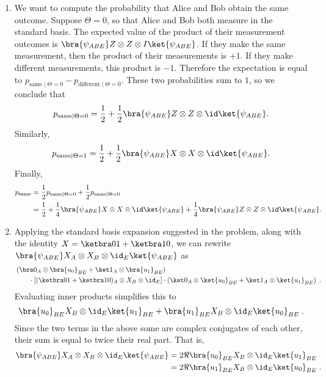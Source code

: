 \begin{exercises}
\begin{enumerate}
\item We want to compute the probability that Alice and Bob obtain the same outcome. Suppose $\Theta = 0$, so that Alice and Bob both measure in the standard basis.
The expected value of the product of their measurement outcomes is $\bra{\psi_{ABE}} Z\otimes Z \otimes I \ket{\psi_{ABE}}$. If they make the same measurement, then the product of their measurements is $+1$. If they make different measurements, this product is $-1$.
Therefore the expectation is equal to $p_{\text{same}\mid\Theta = 0} - p_{\text{different}\mid\Theta = 0}$. These two probabilities sum to $1$, so we conclude that
\[p_{\text{same}\mid\Theta = 0} = \frac12 + \frac 12\bra{\psi_{ABE}} Z\otimes Z \otimes \id \ket{\psi_{ABE}}.\]
Similarly,
\[p_{\text{same}\mid\Theta = 1} = \frac12 + \frac 12\bra{\psi_{ABE}} X\otimes X \otimes \id \ket{\psi_{ABE}}.\]
Finally,
\begin{align*}
p_{\text{same}} &= \frac12 p_{\text{same}\mid\Theta = 0} + \frac 12 p_{\text{same}\mid\Theta = 0}\\
&= \frac12 + \frac 14\bra{\psi_{ABE}} X\otimes X \otimes \id \ket{\psi_{ABE}}+ \frac 14\bra{\psi_{ABE}} Z\otimes Z \otimes \id \ket{\psi_{ABE}}.
\end{align*}

\item Applying the standard basis expansion suggested in the problem, along with the identity $X = \ketbra 01 + \ketbra 10$, we can rewrite $\bra{\psi_{ABE}} X_A\otimes X_B \otimes \id_E \ket{\psi_{ABE}}$ as
\begin{align*}
&\left(\bra 0_A \otimes \bra{u_0}_{BE} +\ket 1_A \otimes \bra{u_1}_{BE}\right)\\
&\qquad \cdot \left[(\ketbra01 + \ketbra10)_A\otimes X_B\otimes \id_E \right] \cdot  \left(\ket 0_A\otimes \ket{u_0}_{BE} +\ket 1_A \otimes \ket{u_1}_{BE}\right)\;.
\end{align*}
Evaluating inner products simplifies this to
\[
\bra{u_0}_{BE}X_B\otimes \id_E\ket{u_1}_{BE} +
\bra{u_1}_{BE}X_B\otimes \id_E\ket{u_0}_{BE}\;.
\]
Since the two terms in the above some are complex conjugates of each other, their sum is equal to twice their real part. That is,
\begin{align*}
\bra{\psi_{ABE}} X_A\otimes X_B \otimes \id_E \ket{\psi_{ABE}}
&=2\Re\bra{u_0}_{BE}X_B\otimes \id_E\ket{u_1}_{BE}\\
&=2\Re\bra{u_1}_{BE}X_B\otimes \id_E\ket{u_0}_{BE}\;.
\end{align*}


\end{enumerate}
\end{exercises}
